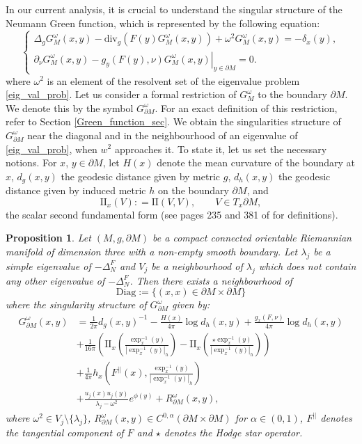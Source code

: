 \documentclass[12pt,a4paper]{amsart}
\numberwithin{equation}{section}
\theoremstyle{plain}
\newtheorem{proposition}[theorem]{Proposition}
\theoremstyle{definition}
\begin{document}
	In our current analysis, it is crucial to understand the singular structure of the Neumann Green function, which is represented by the following equation:
	\begin{equation*}
		\begin{cases}
			\Delta_gG_M^\omega(x,y)-\text{div}_g(F(y)G_M^\omega(x,y))+\omega^2G_M^\omega(x,y) = -\delta_x(y), \\
			\left.\partial_\nu G_M^\omega(x,y) - g_y(F(y),\nu)G_M^\omega(x,y)\right\vert_{y\in \partial M} = 0.
		\end{cases}
	\end{equation*}
	where $\omega^2$ is an element of the resolvent set of the eigenvalue problem \eqref{eig_val_prob}. Let us consider a formal restriction of $G_M^\omega$ to the boundary $\partial M$. We denote this by the symbol $G_{\partial M}^\omega$. For an exact definition of this restriction, refer to Section \ref{Green_function_sec}. We obtain the singularities structure of $G_{\partial M}^\omega$ near the diagonal and in the neighbourhood of an eigenvalue of \eqref{eig_val_prob}, when $w^2$ approaches it. To state it, let us set the necessary notions. For $x$, $y\in \partial M$, let $H(x)$ denote the mean curvature of the boundary at $x$, $d_g(x,y)$ the geodesic distance given by metric $g$, $d_h(x,y)$ the geodesic distance given by induced metric $h$ on the boundary $\partial M$, and
	\begin{equation*}
		\mathrm{II}_x(V): = \mathrm{II}(V,V), \qquad V\in T_x\partial M,
	\end{equation*}
	the scalar second fundamental form (see pages 235 and 381 of \cite{lee} for definitions).
	\begin{proposition}\label{sing_stract}
		Let $(M,g,\partial M)$ be a compact connected orientable Riemannian manifold of dimension three with a non-empty smooth boundary. Let $\lambda_j$ be a simple eigenvalue of $-\Delta_N^F$ and $V_j$ be a neighbourhood of $\lambda_j$ which does not contain any other eigenvalue of $-\Delta_N^F$. Then there exists a neighbourhood of 
		$$\mathrm{Diag}:=\{(x,x)\in \partial M\times \partial M\}$$ 
		where the singularity structure of $G_{\partial M}^\omega$ given by:
		\begin{align}\label{sing_stract_formula}
		\nonumber	G^\omega_{\partial M}(x,y)&=\frac{1}{2\pi}d_g(x,y)^{-1} -\frac{H(x)}{4\pi}\log d_h(x,y)+\frac{g_x(F,\nu)}{4\pi}\log d_h(x,y)\\ \nonumber&+\frac{1}{16\pi}\left(\mathrm{II}_{x}\left(\frac{\exp_{x}^{-1}(y)}{|\exp_{x}^{-1}(y)|_h}\right)-\mathrm{II}_{x}\left(\frac{\star\exp_{x}^{-1}(y)}{|\exp_{x}^{-1}(y)|_h}\right)\right) \\
			& +\frac{1}{4\pi}h_{x}\left(F^{||}(x),\frac{\exp^{-1}_{x}(y)}{|\exp^{-1}_{x}(y)|_h}\right)\\
		\nonumber	& + \frac{u_j(x)u_j(y)}{\lambda_j - \omega^2}e^{\phi(y)}  + R_{\partial M}^\omega(x,y),
		\end{align}
		where $\omega^2 \in V_j\setminus \{\lambda_j\}$, $R^\omega_{\partial M}(x,y) \in C^{0,\alpha}(\partial M\times \partial M)$ for $\alpha\in (0,1)$, $F^{||}$ denotes the tangential component of $F$ and $\star$ denotes the Hodge star operator. 
	\end{proposition}
\end{document}
